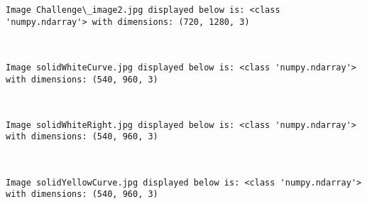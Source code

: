 \documentclass[11pt]{article}
\begin{document}
    \begin{Verbatim}[commandchars=\\\{\}]
Image Challenge\_image2.jpg displayed below is: <class 'numpy.ndarray'> with dimensions: (720, 1280, 3)

    \end{Verbatim}

    \begin{center}
    \end{center}
    { \hspace*{\fill} \\}
    
    \begin{Verbatim}[commandchars=\\\{\}]
Image solidWhiteCurve.jpg displayed below is: <class 'numpy.ndarray'> with dimensions: (540, 960, 3)

    \end{Verbatim}

    \begin{center}
    \end{center}
    { \hspace*{\fill} \\}
    
    \begin{Verbatim}[commandchars=\\\{\}]
Image solidWhiteRight.jpg displayed below is: <class 'numpy.ndarray'> with dimensions: (540, 960, 3)

    \end{Verbatim}

    \begin{center}
    \end{center}
    { \hspace*{\fill} \\}
    
    \begin{Verbatim}[commandchars=\\\{\}]
Image solidYellowCurve.jpg displayed below is: <class 'numpy.ndarray'> with dimensions: (540, 960, 3)

    \end{Verbatim}

    \begin{center}
    \end{center}
    { \hspace*{\fill} \\}
    
\end{document}

